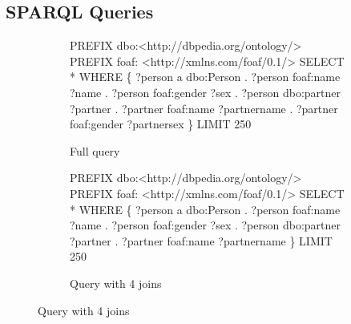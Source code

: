 \documentclass[10pt,a4paper]{article}
\begin{document}
	\subsection*{SPARQL Queries}
	\vspace{-1em}
	\begin{figure}[h!]
		\centering
		\begin{subfigure}{0.45\textwidth}
			\begin{algorithmic}
				\STATE PREFIX dbo:\textless http://dbpedia.org/ontology/\textgreater
				\STATE PREFIX foaf: \textless http://xmlns.com/foaf/0.1/\textgreater
				\STATE SELECT *
				\STATE WHERE \{
				\STATE 	?person a dbo:Person .
				\STATE 	?person foaf:name ?name .
				\STATE 	?person foaf:gender ?sex .
				\STATE 	?person dbo:partner ?partner .
				\STATE 	?partner foaf:name ?partnername .
				\STATE 	?partner foaf:gender ?partnersex
				\STATE \}
				\STATE LIMIT 250
			\end{algorithmic}
			\caption{Full query}
		\end{subfigure}
		\begin{subfigure}{0.45\textwidth}
			\begin{algorithmic}
				\STATE PREFIX dbo:\textless http://dbpedia.org/ontology/\textgreater
				\STATE PREFIX foaf: \textless http://xmlns.com/foaf/0.1/\textgreater
				\STATE SELECT *
				\STATE WHERE \{
				\STATE 	?person a dbo:Person .
				\STATE 	?person foaf:name ?name .
				\STATE 	?person foaf:gender ?sex .
				\STATE 	?person dbo:partner ?partner .
				\STATE 	?partner foaf:name ?partnername
				\STATE \}
				\STATE LIMIT 250
			\end{algorithmic}
			\caption{Query with 4 joins}
		\end{subfigure}
	

\end{figure}
\end{document}
